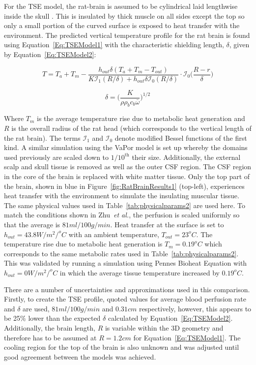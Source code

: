 \documentclass[11pt,english,a4paper,twoside,openright]{report}
\begin{document}
{{{{{{{For the TSE model, the rat-brain is assumed to be cylindrical laid lengthwise inside the skull \cite{zhu2006body}. This is insulated by thick muscle on all sides except the top so only a small portion of the curved surface is exposed to heat transfer with the environment. The predicted vertical temperature profile for the rat brain is found using Equation~\ref{Eq:TSEModel1} with the characteristic shielding length, $\delta$, given by Equation~\ref{Eq:TSEModel2}: 

\begin{equation}
\label{Eq:TSEModel1}
T = T_{a} + T_{m} - \frac{h_{out}\delta(T_{a}+T_{m}-T_{out})}{K\mathcal{I}_{1}(R/\delta)+h_{out}\delta \mathcal{I}_{0}(R/\delta)}\cdot \mathcal{I}_{0}\bigg(\frac{R-r}{\delta}\bigg)
\end{equation}

\begin{equation}
\label{Eq:TSEModel2}
\delta=\bigg(\frac{K}{\rho\rho_{b}c_{b}\bar{\omega}}\bigg)^{1/2}
\end{equation}

Where $T_{m}$ is the average temperature rise due to metabolic heat generation and $R$ is the overall radius of the rat head (which corresponds to the vertical length of the rat brain). The terms $\mathcal{I}_{1}$ and $\mathcal{I}_{0}$ denote modified Bessel functions of the first kind. A similar simulation using the VaPor model is set up whereby the domains used previously are scaled down to $1/10^{\text{th}}$ their size. Additionally, the external scalp and skull tissue is removed as well as the outer CSF region. The CSF region in the core of the brain is replaced with white matter tissue. Only the top part of the brain, shown in blue in Figure~\ref{fig:RatBrainResults1} (top-left), experiences heat transfer with the environment to simulate the insulating muscular tissue. The same physical values used in Table~\ref{tab:physicalparams2} are used here. To match the conditions shown in Zhu~\textit{et al.}, the perfusion is scaled uniformly so that the average is $81ml/100g/min$. Heat transfer at the surface is set to $h_{out}=43.8W/m^{2}/^{o}C$ with an ambient temperature, $T_{out}=23^{o}C$. The temperature rise due to metabolic heat generation is $T_{m}=0.19^{o}C$ which corresponds to the same metabolic rates used in Table~\ref{tab:physicalparams2}. This was validated by running a simulation using Pennes Bioheat Equation with $h_{out}=0W/m^{2}/^{o}C$ in which the average tissue temperature increased by $0.19^{o}C$.

There are a number of uncertainties and approximations used in this comparison. Firstly, to create the TSE profile, quoted values for average blood perfusion rate and $\delta$ are used, $81ml/100g/min$ and $0.31cm$ respectively, however, this appears to be 25\% lower than the expected $\delta$ calculated by Equation~\ref{Eq:TSEModel2}. Additionally, the brain length, $R$ is variable within the 3D geometry and therefore has to be assumed at $R=1.2cm$ for Equation~\ref{Eq:TSEModel1}. The cooling region for the top of the brain is also unknown and was adjusted until good agreement between the models was achieved.

}}}}}}}
\end{document}
